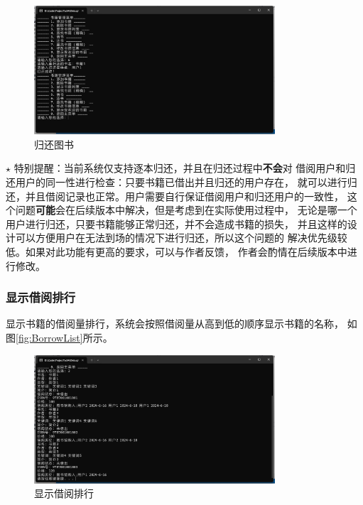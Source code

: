 \documentclass[12pt,twoside]{ctexart}
\begin{document}
\begin{figure}[H]
    \centering
    \includegraphics[width=0.8\textwidth]{Book/returnsucc.png}
    \caption{归还图书}
    \label{fig:Return}
\end{figure}

$\star$ 特别提醒：当前系统仅支持逐本归还，并且在归还过程中\textbf{不会}对
借阅用户和归还用户的同一性进行检查：只要书籍已借出并且归还的用户存在，
就可以进行归还，并且借阅记录也正常。用户需要自行保证借阅用户和归还用户的一致性，
这个问题\textbf{可能}会在后续版本中解决，但是考虑到在实际使用过程中，
无论是哪一个用户进行归还，只要书籍能够正常归还，并不会造成书籍的损失，
并且这样的设计可以方便用户在无法到场的情况下进行归还，所以这个问题的
解决优先级较低。如果对此功能有更高的要求，可以与作者反馈，
作者会酌情在后续版本中进行修改。

\newpage
\subsubsection{显示借阅排行}

显示书籍的借阅量排行，系统会按照借阅量从高到低的顺序显示书籍的名称，
如图\ref{fig:BorrowList}所示。

\begin{figure}[H]
    \centering
    \includegraphics[width=0.8\textwidth]{Book/borrowlistq.png}
    \caption{显示借阅排行}
\end{figure}
\end{document}

